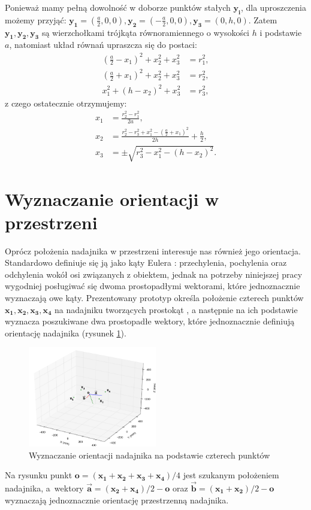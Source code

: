 Ponieważ mamy pełną dowolność w doborze punktów stałych $\boldsymbol{y_i}$, dla uproszczenia możemy przyjąć:
$\boldsymbol{y_1}=(\frac{a}{2},0,0), \boldsymbol{y_2}=(-\frac{a}{2},0,0), \boldsymbol{y_3}=(0,h,0)$. 
Zatem $\boldsymbol{y_1}, \boldsymbol{y_2}, \boldsymbol{y_3}$ są wierzchołkami
trójkąta równoramiennego o wysokości $h$ i podstawie $a$, natomiast układ równań upraszcza
się do postaci:
 \begin{align}
    \nonumber  (\frac{a}{2}-x_1)^2 + x_2^2 + x_3^2 &= r_1^2,
 \\ \nonumber  (\frac{a}{2}+x_1)^2 + x_2^2 + x_3^2 &= r_2^2,
 \\ \nonumber  x_1^2 + (h-x_2)^2 + x_3^2 &= r_3^2,
 \end{align}
z czego ostatecznie otrzymujemy:
 \begin{align}
    \nonumber  x_1 &= \frac{r_2^2 - r_1^2}{2a},
 \\ \nonumber  x_2 &= \frac{r_2^2 - r_3^2 + x_1^2 - (\frac{a}{2}+x_1)^2}{2h}  + \frac{h}{2},
 \\ \nonumber  x_3 &= \pm \sqrt{r_3^2-x_1^2-(h-x_2)^2}.
 \end{align}


\section{Wyznaczanie orientacji w przestrzeni}

Oprócz położenia nadajnika w przestrzeni interesuje nas również jego orientacja.
Standardowo definiuje się ją jako kąty Eulera \cite{bib:katyEulera}: przechylenia, 
pochylenia oraz odchylenia wokół osi związanych z obiektem, jednak na potrzeby niniejszej pracy wygodniej 
posługiwać się dwoma prostopadłymi wektorami, które jednoznacznie wyznaczają owe kąty. 
Prezentowany prototyp określa położenie czterech punktów $\boldsymbol{x_1, x_2, x_3, x_4}$ na nadajniku tworzących prostokąt 
, a następnie na ich podstawie wyznacza poszukiwane dwa prostopadłe wektory, które jednoznacznie
definiują orientację nadajnika (rysunek \ref{fig:orientacja}).
 \begin{figure}[H]
    \centering
    \includegraphics[width=0.5\textwidth, trim= 0mm 0mm 0mm 0mm,clip]{orientacja}
    \caption{Wyznaczanie orientacji nadajnika na podstawie czterech punktów}
    \label{fig:orientacja}
\end{figure}
Na rysunku punkt $\boldsymbol{o} = (\boldsymbol{x_1} + \boldsymbol{x_2} + \boldsymbol{x_3} + \boldsymbol{x_4})/4$ jest szukanym położeniem
nadajnika, a~wektory $\boldsymbol{\overrightarrow{a}} = (\boldsymbol{x_2} + \boldsymbol{x_4})/2 - \boldsymbol{o}$ oraz 
$\boldsymbol{\overrightarrow{b}} = (\boldsymbol{x_1} + \boldsymbol{x_2})/2 - \boldsymbol{o}$ wyznaczają jednoznacznie
orientację przestrzenną nadajnika.

